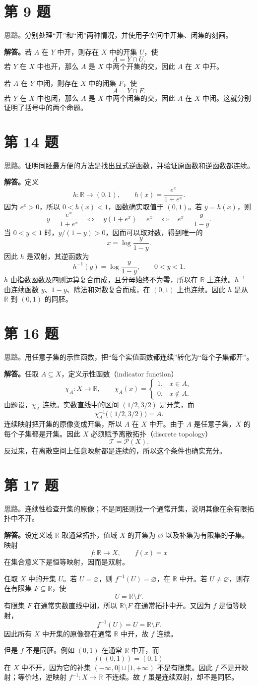 \documentclass[UTF8,a4paper,11pt,fontset=windows]{ctexart}
\newcommand{\problem}[1]{\section*{第 #1 题}}
\newcommand{\idea}{\par\noindent\textcolor{gray}{\textbf{思路。}}}
\newcommand{\solution}{\par\noindent\textbf{解答。}}
\newcommand{\R}{\mathbb R}
\begin{document}
\problem{9}
\idea 分别处理“开”和“闭”两种情况，并使用子空间中开集、闭集的刻画。

\solution 若 $A$ 在 $Y$ 中开，则存在 $X$ 中的开集 $U$，使
\[
  A=Y\cap U.
\]
若 $Y$ 在 $X$ 中也开，那么 $A$ 是 $X$ 中两个开集的交，因此 $A$ 在 $X$ 中开。

若 $A$ 在 $Y$ 中闭，则存在 $X$ 中的闭集 $F$，使
\[
  A=Y\cap F.
\]
若 $Y$ 在 $X$ 中也闭，那么 $A$ 是 $X$ 中两个闭集的交，因此 $A$ 在 $X$ 中闭。这就分别证明了括号中的两个命题。

\problem{14}
\idea 证明同胚最方便的方法是找出显式逆函数，并验证原函数和逆函数都连续。

\solution 定义
\[
  h:\R\longrightarrow(0,1),\qquad h(x)=\frac{e^x}{1+e^x}.
\]
因为 $e^x>0$，所以 $0<h(x)<1$，函数确实取值于 $(0,1)$。若 $y=h(x)$，则
\[
  y=\frac{e^x}{1+e^x}
  \quad\Longleftrightarrow\quad
  y(1+e^x)=e^x
  \quad\Longleftrightarrow\quad
  e^x=\frac{y}{1-y}.
\]
当 $0<y<1$ 时，$y/(1-y)>0$，因而可以取对数，得到唯一的
\[
  x=\log\frac{y}{1-y}.
\]
因此 $h$ 是双射，其逆函数为
\[
  h^{-1}(y)=\log\frac{y}{1-y},\qquad 0<y<1.
\]
$h$ 由指数函数及四则运算复合而成，且分母始终不为零，所以在 $\R$ 上连续。$h^{-1}$ 由连续函数 $y$、$1-y$、除法和对数复合而成，在 $(0,1)$ 上也连续。因此 $h$ 是从 $\R$ 到 $(0,1)$ 的同胚。

\problem{16}
\idea 用任意子集的示性函数，把“每个实值函数都连续”转化为“每个子集都开”。

\solution 任取 $A\subseteq X$，定义示性函数（indicator function）
\[
  \chi_A:X\longrightarrow\R,
  \qquad
  \chi_A(x)=
  \begin{cases}
    1,&x\in A,\\
    0,&x\notin A.
  \end{cases}
\]
由题设，$\chi_A$ 连续。实数直线中的区间 $(1/2,3/2)$ 是开集，而
\[
  \chi_A^{-1}\bigl((1/2,3/2)\bigr)=A.
\]
连续映射把开集的原像变成开集，所以 $A$ 在 $X$ 中开。由于 $A$ 是任意子集，$X$ 的每个子集都是开集。因此 $X$ 必须赋予离散拓扑（discrete topology）
\[
  \mathcal T=\mathcal P(X).
\]
反过来，在离散空间上任意映射都是连续的，所以这个条件也确实充分。

\problem{17}
\idea 连续性检查开集的原像；不是同胚则找一个通常开集，说明其像在余有限拓扑中不开。

\solution 设定义域 $\R$ 取通常拓扑，值域 $X$ 的开集为 $\varnothing$ 以及补集为有限集的子集。映射
\[
  f:\R\longrightarrow X,
  \qquad f(x)=x
\]
在集合意义下是恒等映射，因而是双射。

任取 $X$ 中的开集 $U$。若 $U=\varnothing$，则 $f^{-1}(U)=\varnothing$，在 $\R$ 中开。若 $U\neq\varnothing$，则存在有限集 $F\subseteq\R$，使
\[
  U=\R\setminus F.
\]
有限集 $F$ 在通常实数直线中闭，所以 $\R\setminus F$ 在通常拓扑中开。又因为 $f$ 是恒等映射，
\[
  f^{-1}(U)=U=\R\setminus F.
\]
因此所有 $X$ 中开集的原像都在通常 $\R$ 中开，故 $f$ 连续。

但是 $f$ 不是同胚。例如 $(0,1)$ 在通常 $\R$ 中开，而
\[
  f((0,1))=(0,1)
\]
在 $X$ 中不开，因为它的补集 $(-\infty,0]\cup[1,+\infty)$ 不是有限集。因此 $f$ 不是开映射；等价地，逆映射 $f^{-1}:X\to\R$ 不连续。故 $f$ 虽是连续双射，却不是同胚。

\vfill
{}
\end{document}
